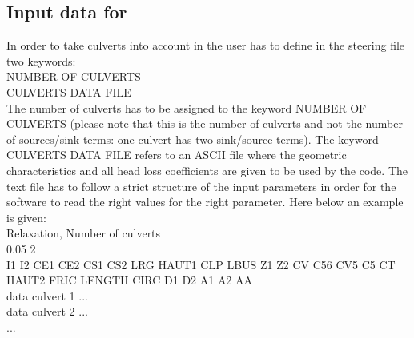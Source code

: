 \subsection{Input data for }

In order to take culverts into account in  the user has to define in the
steering file two keywords: \\
NUMBER OF CULVERTS \\
CULVERTS DATA FILE\\

The number of culverts has to be assigned to the keyword NUMBER OF CULVERTS
(please note that this is the number of culverts and not the number of sources/sink terms:
one culvert has two sink/source terms).
The keyword CULVERTS DATA FILE refers to an ASCII file where the geometric characteristics
and all head loss coefficients are given to be used by the code.
The text file has to follow a strict structure of the input parameters in order
for the software to read the right values for the right parameter.
Here below an example is given:\\

Relaxation, Number of culverts\\
0.05 2\\
I1  I2  CE1  CE2  CS1  CS2  LRG HAUT1 CLP LBUS Z1 Z2 CV  C56  CV5  C5 CT HAUT2 FRIC LENGTH CIRC D1  D2 A1 A2 AA\\
data culvert 1  ...\\
data culvert 2 ...\\
... \\

